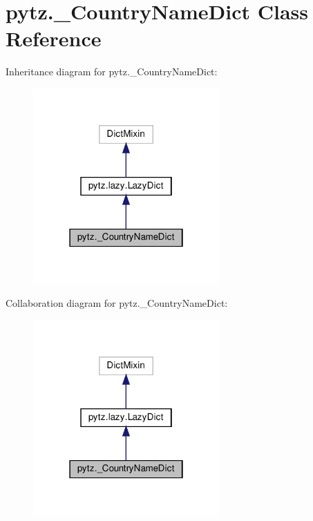 \hypertarget{classpytz_1_1__CountryNameDict}{}\section{pytz.\+\_\+\+Country\+Name\+Dict Class Reference}
\label{classpytz_1_1__CountryNameDict}


Inheritance diagram for pytz.\+\_\+\+Country\+Name\+Dict\+:
\nopagebreak
\begin{figure}[H]
\begin{center}
\leavevmode
\includegraphics[width=202pt]{classpytz_1_1__CountryNameDict__inherit__graph}
\end{center}
\end{figure}


Collaboration diagram for pytz.\+\_\+\+Country\+Name\+Dict\+:
\nopagebreak
\begin{figure}[H]
\begin{center}
\leavevmode
\includegraphics[width=202pt]{classpytz_1_1__CountryNameDict__coll__graph}
\end{center}
\end{figure}
